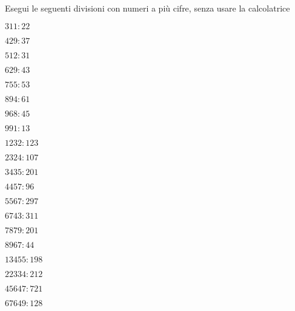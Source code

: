 
\begin{esercizio}
 Esegui le seguenti divisioni con numeri a più cifre, senza usare la 
calcolatrice
\begin{multicols}{4}
 \begin{enumeratea}
 \item \(311:22\)
 \item \(429:37\)
 \item \(512:31\)
 \item \(629:43\)
 \item \(755:53\)
 \item \(894:61\)
 \item \(968:45\)
 \item \(991:13\)
 \item \(1232:123\)
 \item \(2324:107\)
 \item \(3435:201\)
 \item \(4457:96\)
 \item \(5567:297\)
 \item \(6743:311\)
 \item \(7879:201\)
 \item \(8967:44\)
 \item \(13455:198\)
 \item \(22334:212\)
 \item \(45647:721\)
 \item \(67649:128\)
 \end{enumeratea}
\end{multicols}
\end{esercizio}


